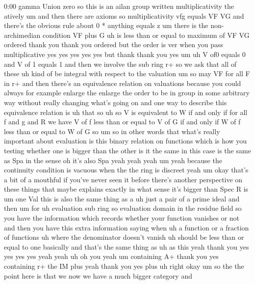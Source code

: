 \begin{unfinished}{0:00}
gamma  Union  zero  so  this  is  an  ailan
group  written  multiplicativity  the
atively  um  and  then  there  are  axioms  so
multiplicativity  vfg  equals  VF  VG  and
there's  the  obvious  rule  about  0  *
anything  equals  z  um  there  is  the  non-
archimedian  condition  VF  plus
G  uh  is  less  than  or  equal  to  maximum  of
VF
VG  ordered  thank  you  thank  you  ordered
but  the  order  is  ver  when  you  pass
multiplicative  yes  yes  yes  yes  yes  but
thank  thank  you  yes  um  uh  V  of0  equals  0
and  V  of  1  equals  1  and  then  we  involve
the  sub  ring  r+  so  we  ask  that  all  of
these  uh  kind  of  be  integral  with
respect  to  the  valuation  um  so  may  VF
for  all  F  in  r+  and  then  there's  an
equivalence  relation  on  valuations
because  you  could  always  for  example
enlarge
the  enlarge  the  order  to  be  in  group  in
some  arbitrary  way  without  really
changing  what's  going  on  and  one  way  to
describe  this  equivalence  relation  is  uh
that  so  uh  so  V  is  equivalent  to  W  if
and  only  if  for  all  f  and  g  and
R  we  have  V  of  f  less  than  or  equal  to  V
of  G  if  and  only  if  W  of  f  less  than  or
equal  to  W  of  G
so
um  so  in  other  words  that  what's  really
important  about  evaluation  is  this
binary  relation  on  functions  which  is
how  you  testing  whether  one  is  bigger
than  the  other  is  it  the  same  in  this
case  is  the  same  as  Spa  in  the  sense  oh
it's  also  Spa  yeah  yeah
yeah  um  yeah  because  the  continuity
condition  is  vacuous  when  the  the  ring
is  discreet
yeah  um  okay  that's  a  bit  of  a  mouthful
if  you've  never  seen  it  before  there's
another  perspective  on  these  things  that
maybe  explains  exactly  in  what  sense
it's  bigger  than  Spec  R  is  um  one  Val
this  is  also  the  same  thing  as  a  uh  just
a
pair  of  a  prime  ideal  and  then  um
for  uh  evaluation  sub  ring  so
evaluation  domain  in  the  residue
field  so  you  have  the  information  which
records  whether  your  function  vanishes
or  not  and  then  you  have  this  extra
information  saying  when
uh  a  function  or  a  fraction  of  functions
uh  where  the  denominator  doesn't  vanish
uh  should  be  less  than  or  equal  to  one
basically  and  that's  the  same  thing
as  uh  as
this  yeah  thank  you  yes  yes  yes  yes  yeah
yeah
uh  oh
you
yeah  um  containing  A+  thank  you  yes
containing  r+  the  IM  plus  yeah  thank  you
yes
plus
uh
right
okay  um  so  the  the  point  here  is  that  we
now  we  have  a  much  bigger  category  and

\end{unfinished}
